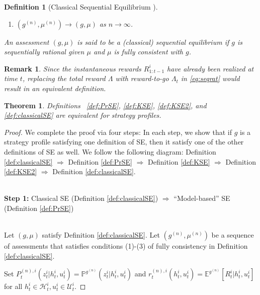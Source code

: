 \documentclass[pdflatex,sn-basic]{sn-jnl}
\newcommand{\E}{\mathbb{E}}
\renewcommand{\Pr}{\mathbb{P}}
\theoremstyle{thmstyleone}%
\newtheorem{thm}{Theorem}
\theoremstyle{thmstyletwo}%
\newtheorem{remark}{Remark}
\theoremstyle{thmstylethree}%
\newtheorem{defn}{Definition}
\begin{document}
\begin{appendices}
\begin{defn}[Classical Sequential Equilibrium \citep{kreps1982sequential}]
\begin{enumerate}[(1)]
		\item $(g^{(n)}, \mu^{(n)}) \rightarrow (g, \mu)$ as $n\rightarrow\infty$.
	\end{enumerate}
	An assessment $(g, \mu)$ is said to be a (classical) sequential equilibrium if $g$ is sequentially rational given $\mu$ and $\mu$ is fully consistent with $g$.
\end{defn}

\begin{remark}
	Since the instantaneous rewards $R_{1:t-1}^i$ {have already been} realized at time $t$, replacing the total reward $\Lambda$ with reward-to-go $\Lambda_t$ in \eqref{eq:seqrat} would result in an equivalent definition. 
\end{remark}

\begin{thm}\label{thm:SEdefequiv}
	Definitions ~\ref{def:PrSE}, \ref{def:KSE}, \ref{def:KSE2}, and \ref{def:classicalSE} are equivalent for strategy profiles.
\end{thm}

\begin{proof}
    {We complete the proof via four steps: In each step, we show that if $g$ is a strategy profile satisfying one definition of SE, then it satisfy one of the other definitions of SE as well. We follow the following diagram: Definition \ref{def:classicalSE} $\Rightarrow$ Definition \ref{def:PrSE} $\Rightarrow$ Definition \ref{def:KSE} $\Rightarrow$ Definition \ref{def:KSE2} $\Rightarrow$ Definition \ref{def:classicalSE}.}\\~
    
 
    \textbf{Step 1:} Classical SE (Definition \ref{def:classicalSE}) $\Rightarrow$ ``Model-based'' SE (Definition \ref{def:PrSE})\\~
		
		Let $(g, \mu)$ satisfy Definition \ref{def:classicalSE}. Let $(g^{(n)}, \mu^{(n)})$ be a sequence of assessments that satisfies conditions (1)-(3) of fully consistency in Definition \ref{def:classicalSE}. 
		
		Set $P_t^{(n), i}(z_t^i|h_t^i, u_t^i) = \Pr^{g^{(n)}}(z_t^i|h_t^i, u_t^i)$ and $r_t^{(n), i}(h_t^i, u_t^i) = \E^{g^{(n)}}[R_t^i|h_t^i, u_t^i]$ for all $h_t^i\in\mathcal{H}_t^i, u_t^i\in\mathcal{U}_t^i$.
		

\end{proof}
\end{appendices}
\end{document}
